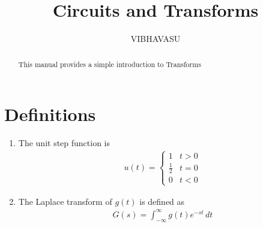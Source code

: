 \documentclass[journal,12pt,twocolumn]{IEEEtran}
\renewcommand\thesection{\arabic{section}}
\begin{document}
	\let\StandardTheFigure\thefigure
	\renewcommand{\thefigure}{\theproblem}
	\renewcommand{\thefigure}{\arabic{section}.\arabic{figure}}
	\makeatletter
	\makeatother
	
	
	\def\putbox#1#2#3{\makebox[0in][l]{\makebox[#1][l]{}\raisebox{\baselineskip}[0in][0in]{\raisebox{#2}[0in][0in]{#3}}}}
	\def\rightbox#1{\makebox[0in][r]{#1}}
	\def\centbox#1{\makebox[0in]{#1}}
	\def\topbox#1{\raisebox{-\baselineskip}[0in][0in]{#1}}
	\def\midbox#1{\raisebox{-0.5\baselineskip}[0in][0in]{#1}}
	
	\vspace{3cm}

	\vspace{3cm}
	
	\title{ 
		Circuits and Transforms
	}
	\author{VIBHAVASU}


\maketitle


\tableofcontents


\renewcommand{\thefigure}{\theenumi}
\renewcommand{\thetable}{\theenumi}



\bigskip

\begin{abstract}
This manual provides a simple introduction to Transforms
\end{abstract}



\section{Definitions}
\begin{enumerate}[label=\arabic*.,ref=\thesection.\theenumi]
\item The unit step function is 
\begin{align}
	u(t) =
	\begin{cases}
		1 & t > 0
		\\
		\frac{1}{2} & t = 0
		\\
		0 & t < 0
	\end{cases}
\end{align}
\item The Laplace transform of $g(t)$ is defined as 
\begin{align}
	G(s) = \int_{-\infty}^{\infty} g(t) e^{-st}\, dt
\end{align}
\end{enumerate}
\end{document}
